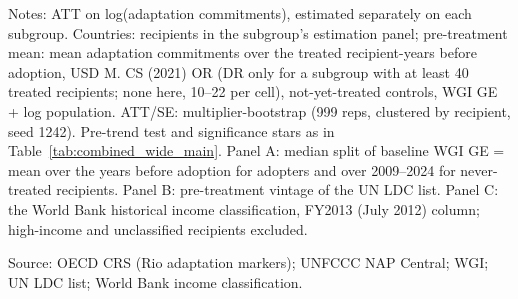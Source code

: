 \begin{table}[H]
\centering
\caption{NAP effect by baseline capacity: governance, LDC status and income group}
\label{tab:het_capacity}
\begingroup\small
{}
\endgroup
\par\vspace{4pt}
\begin{minipage}{\linewidth}\footnotesize
Notes: ATT on log(adaptation commitments), estimated separately on each subgroup. Countries: recipients in the subgroup's estimation panel; pre-treatment mean: mean adaptation commitments over the treated recipient-years before adoption, USD M. CS (2021) OR (DR only for a subgroup with at least 40 treated recipients; none here, 10--22 per cell), not-yet-treated controls, WGI GE + log population. ATT/SE: multiplier-bootstrap (999 reps, clustered by recipient, seed 1242). Pre-trend test and significance stars as in Table~\ref{tab:combined_wide_main}. Panel A: median split of baseline WGI GE = mean over the years before adoption for adopters and over 2009--2024 for never-treated recipients. Panel B: pre-treatment vintage of the UN LDC list. Panel C: the World Bank historical income classification, FY2013 (July 2012) column; high-income and unclassified recipients excluded.\par
Source: OECD CRS (Rio adaptation markers); UNFCCC NAP Central; WGI; UN LDC list; World Bank income classification.
\end{minipage}
\end{table}
